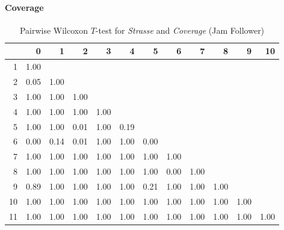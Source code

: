 \paragraph{Coverage}

\begin{table}[ht]
	\tiny
	\centering
	\begin{tabular}{rrrrrrrrrrrr}
		\hline
		  & 0 & 1 & 2 & 3 & 4 & 5 & 6 & 7 & 8 & 9 & 10 \\ 
		\hline
		1 & 1.00 &  &  &  &  &  &  &  &  &  &  \\ 
		2 & 0.05 & 1.00 &  &  &  &  &  &  &  &  &  \\ 
		3 & 1.00 & 1.00 & 1.00 &  &  &  &  &  &  &  &  \\ 
		4 & 1.00 & 1.00 & 1.00 & 1.00 &  &  &  &  &  &  &  \\ 
		5 & 1.00 & 1.00 & 0.01 & 1.00 & 0.19 &  &  &  &  &  &  \\ 
		6 & 0.00 & 0.14 & 0.01 & 1.00 & 1.00 & 0.00 &  &  &  &  &  \\ 
		7 & 1.00 & 1.00 & 1.00 & 1.00 & 1.00 & 1.00 & 1.00 &  &  &  &  \\ 
		8 & 1.00 & 1.00 & 1.00 & 1.00 & 1.00 & 1.00 & 0.00 & 1.00 &  &  &  \\ 
		9 & 0.89 & 1.00 & 1.00 & 1.00 & 1.00 & 0.21 & 1.00 & 1.00 & 1.00 &  &  \\ 
		10 & 1.00 & 1.00 & 1.00 & 1.00 & 1.00 & 1.00 & 1.00 & 1.00 & 1.00 & 1.00 &  \\ 
		11 & 1.00 & 1.00 & 1.00 & 1.00 & 1.00 & 1.00 & 1.00 & 1.00 & 1.00 & 1.00 & 1.00 \\ 
		\hline
	  \end{tabular}
    \caption{Pairwise Wilcoxon $T$-test for \textit{Strasse} and \textit{Coverage} (Jam Follower)}
    \label{tbl:wilcoxon_baysis_follower_Strasse_Cov}
\end{table}
